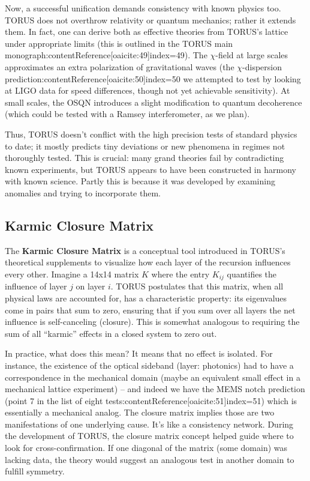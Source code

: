 \documentclass[12pt]{article}
\begin{document}
Now, a successful unification demands consistency with known physics too. TORUS does not overthrow relativity or quantum mechanics; rather it extends them. In fact, one can derive both as effective theories from TORUS’s lattice under appropriate limits (this is outlined in the TORUS main monograph:contentReference[oaicite:49]{index=49}). The $\chi$-field at large scales approximates an extra polarization of gravitational waves (the $\chi$-dispersion prediction:contentReference[oaicite:50]{index=50} we attempted to test by looking at LIGO data for speed differences, though not yet achievable sensitivity). At small scales, the OSQN introduces a slight modification to quantum decoherence (which could be tested with a Ramsey interferometer, as we plan).

Thus, TORUS doesn’t conflict with the high precision tests of standard physics to date; it mostly predicts tiny deviations or new phenomena in regimes not thoroughly tested. This is crucial: many grand theories fail by contradicting known experiments, but TORUS appears to have been constructed in harmony with known science. Partly this is because it was developed by examining anomalies and trying to incorporate them.

\subsection{Karmic Closure Matrix}
The \textbf{Karmic Closure Matrix} is a conceptual tool introduced in TORUS’s theoretical supplements to visualize how each layer of the recursion influences every other. Imagine a 14x14 matrix $K$ where the entry $K_{ij}$ quantifies the influence of layer $j$ on layer $i$. TORUS postulates that this matrix, when all physical laws are accounted for, has a characteristic property: its eigenvalues come in pairs that sum to zero, ensuring that if you sum over all layers the net influence is self-canceling (closure). This is somewhat analogous to requiring the sum of all “karmic” effects in a closed system to zero out.

In practice, what does this mean? It means that no effect is isolated. For instance, the existence of the optical sideband (layer: photonics) had to have a correspondence in the mechanical domain (maybe an equivalent small effect in a mechanical lattice experiment) – and indeed we have the MEMS notch prediction (point 7 in the list of eight tests:contentReference[oaicite:51]{index=51}) which is essentially a mechanical analog. The closure matrix implies those are two manifestations of one underlying cause. It’s like a consistency network. During the development of TORUS, the closure matrix concept helped guide where to look for cross-confirmation. If one diagonal of the matrix (some domain) was lacking data, the theory would suggest an analogous test in another domain to fulfill symmetry.
\end{document}
